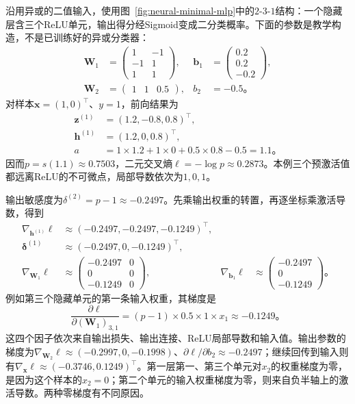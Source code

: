 \begin{example}[一次前向与反向计算]
  \label{ex:ffn-numerical-backpropagation}
  沿用异或的二值输入，使用图~\ref{fig:neural-minimal-mlp}中的$2$-$3$-$1$结构：一个隐藏层含三个ReLU单元，输出得分经Sigmoid变成二分类概率。下面的参数是教学构造，不是已训练好的异或分类器：
  \[
    \begin{aligned}
      \bm{W}_1&=\begin{pmatrix}1&-1\\-1&1\\1&1\end{pmatrix},
      &\bm{b}_1&=\begin{pmatrix}0.2\\0.2\\-0.2\end{pmatrix},\\
      \bm{W}_2&=\begin{pmatrix}1&1&0.5\end{pmatrix},
      &b_2&=-0.5\text{。}
    \end{aligned}
  \]
  对样本$\bm{x}=(1,0)^{\top}$、$y=1$，前向结果为
  \[
    \begin{aligned}
      \bm{z}^{(1)}&=(1.2,-0.8,0.8)^{\top},\\
      \bm{h}^{(1)}&=(1.2,0,0.8)^{\top},\\
      a&=1\times1.2+1\times0+0.5\times0.8-0.5=1.1\text{。}
    \end{aligned}
  \]
  因而$p=s(1.1)\approx0.7503$，二元交叉熵$\ell=-\log p\approx0.2873$。本例三个预激活值都远离ReLU的不可微点，局部导数依次为$1,0,1$。

  输出敏感度为$\delta^{(2)}=p-1\approx-0.2497$。先乘输出权重的转置，再逐坐标乘激活导数，得到
  \[
    \begin{aligned}
      \nabla_{\bm{h}^{(1)}}\ell
        &\approx(-0.2497,-0.2497,-0.1249)^{\top},\\
      \bm{\delta}^{(1)}&\approx(-0.2497,0,-0.1249)^{\top},\\
      \nabla_{\bm{W}_1}\ell&\approx
      \begin{pmatrix}-0.2497&0\\0&0\\-0.1249&0\end{pmatrix},
      &\nabla_{\bm{b}_1}\ell&\approx
      \begin{pmatrix}-0.2497\\0\\-0.1249\end{pmatrix}\text{。}
    \end{aligned}
  \]
  例如第三个隐藏单元的第一条输入权重，其梯度是
  \[
    \frac{\partial\ell}{\partial(\bm{W}_1)_{3,1}}
    =(p-1)\times0.5\times1\times x_1
    \approx-0.1249\text{。}
  \]
  这四个因子依次来自输出损失、输出连接、ReLU局部导数和输入值。输出参数的梯度为$\nabla_{\bm{W}_2}\ell\approx(-0.2997,0,-0.1998)$、$\partial\ell/\partial b_2\approx-0.2497$；继续回传到输入则有$\nabla_{\bm{x}}\ell\approx(-0.3746,0.1249)^{\top}$。第一层第一、第三个单元对$x_2$的权重梯度为零，是因为这个样本的$x_2=0$；第二个单元的输入权重梯度为零，则来自负半轴上的激活导数。两种零梯度有不同原因。


\end{example}
